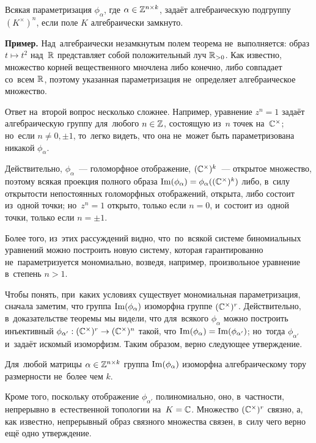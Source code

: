 \documentclass[a4paper,oneside]{article}
\begin{document}
\begin{theorem}
\label{theorem:AlgebraicityCondition}
  Всякая параметризация $\phi_\alpha$, где $\alpha \in \mathbb{Z}^{n \times k}$, задаёт алгебраическую подгруппу $(K^\times)^n$,
  если поле $K$ алгебраически замкнуто.
\end{theorem}

\noindent\textbf{Пример.} Над~алгебраически незамкнутым полем теорема не~выполняется: образ $t \mapsto t^2$ над~$\mathbb{R}$
представляет собой положительный луч $\mathbb{R}_{>0}$. Как известно, множество корней вещественного мночлена либо конечно,
либо совпадает со~всем $\mathbb{R}$, поэтому указанная параметризация не~определяет алгебраическое множество.
\medskip

Ответ на~второй вопрос несколько сложнее. Например, уравнение $z^n = 1$ задаёт алгебраическую
группу для~любого $n \in \mathbb{Z}$, состоящую из~$n$ точек на~$\mathbb{C}^\times$; но~если $n \neq 0, \pm 1$,
то~легко видеть, что она не~может быть параметризована никакой $\phi_\alpha$.

Действительно, $\phi_\alpha$~— голоморфное отображение, $(\mathbb{C}^\times)^k$~— открытое множество,
поэтому всякая проекция полного образа $\mathrm{Im}(\phi_\alpha) = \phi_\alpha((\mathbb{C}^\times)^k)$ либо, в~силу
открытости непостоянных голоморфных отображений, открыта, либо состоит из~одной точки; но~$z^n = 1$
открыто, только если $n = 0$, и~состоит из~одной точки, только если $n = \pm 1$.

Более того, из~этих рассуждений видно, что~по~всякой системе биномиальных уравнений можно построить новую систему,
которая гарантированно не~параметризуется мономиально, возведя, например, произвольное уравнение в~степень $n > 1$.

Чтобы понять, при~каких условиях существует мономиальная параметризация, сначала заметим, что группа $\mathrm{Im}(\phi_\alpha)$
изоморфна группе $(\mathbb{C}^\times)^r$. Действительно, в~доказательстве теоремы мы видели, что для~всякого $\phi_\alpha$
можно построить инъективный $\phi_{\alpha'} : (\mathbb{C}^\times)^r \rightarrow (\mathbb{C}^\times)^n$ такой, что $\mathrm{Im}(\phi_\alpha) = \mathrm{Im}(\phi_{\alpha'})$;
но~тогда $\phi_{\alpha'}$ и~задаёт искомый изоморфизм. Таким образом, верно следующее утверждение.

\begin{statement*}
  Для~любой матрицы $\alpha \in \mathbb{Z}^{n \times k}$ группа $\mathrm{Im}(\phi_\alpha)$ изоморфна алгебраическому тору размерности не~более чем $k$.
\end{statement*}

Кроме того, поскольку отображение $\phi_{\alpha'}$ полиномиально, оно, в~частности, непрерывно в~естественной топологии на~$K = \mathbb{C}$.
Множество $(\mathbb{C}^\times)^r$ связно, а, как известно, непрерывный образ связного множества связен, в~силу чего верно ещё одно утверждение.
\end{document}
